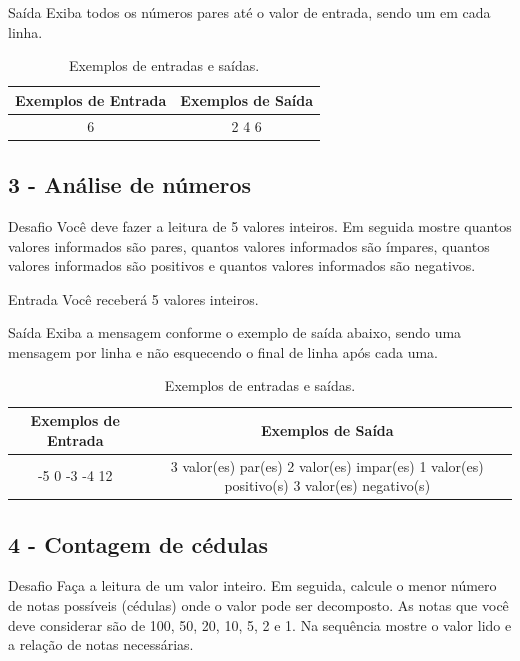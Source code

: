 \documentclass[12pt,a4paper]{article}
\begin{document}
	Saída
	Exiba todos os números pares até o valor de entrada, sendo um em cada linha. 
	
	
	\begin{table}[!htpb]
		\centering
		\begin{tabular}{|c|c|}
			\hline
			Exemplos de Entrada & Exemplos de Saída \\
			\hline
			6 &2 4 6\\
			\hline
		\end{tabular}
		\caption{Exemplos de entradas e saídas.}
		\label{tab:valEntradasSaidas2}
	\end{table}
	
	\subsection{3 - Análise de números}
	
	Desafio
	Você deve fazer a leitura de 5 valores inteiros. Em seguida mostre quantos valores informados são pares, quantos valores informados são ímpares, quantos valores informados são positivos e quantos valores informados são negativos.
	
	Entrada
	Você receberá 5 valores inteiros.
	
	Saída
	Exiba a mensagem conforme o exemplo de saída abaixo, sendo uma mensagem por linha e não esquecendo o final de linha após cada uma.
	
	\begin{table}[!htpb]
		\centering
		\begin{tabular}{|c|c|}
			\hline
			Exemplos de Entrada & Exemplos de Saída \\
			\hline
			-5 0 -3 -4 12 & 3 valor(es) par(es) 2 valor(es) impar(es) 1 valor(es) positivo(s) 3 valor(es) negativo(s)\\
			\hline
		\end{tabular}
		\caption{Exemplos de entradas e saídas.}
		\label{tab:valEntradasSaidas3}
	\end{table}
	
	\subsection{4 - Contagem de cédulas}
	
	Desafio
	Faça a leitura de um valor inteiro. Em seguida, calcule o menor número de notas possíveis (cédulas) onde o valor pode ser decomposto. As notas que você deve considerar são de 100, 50, 20, 10, 5, 2 e 1. Na sequência mostre o valor lido e a relação de notas necessárias.
	
\end{document}
